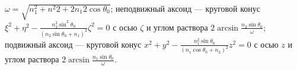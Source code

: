 $\omega=\sqrt{n^2_{1}+n^2{2}+2n_{1}{2}\cos\theta_{0}}$; неподвижный аксоид --- круговой конус
$\xi^2+\eta^2-\frac{n^2_{2}\sin^2\theta_{0}}{\left(n_{2}\sin\theta_{0}+n_{1}\right)^2}\zeta^2=0$ с осью $\zeta$ и углом раствора
$2\arcsin\frac{n_{2}\sin\theta_{0}}{\omega}$; подвижный аксоид --- круговой конус 
$x^2+y^2-\frac{n^2_{1}\sin\theta_{0}}{\left(n_{1}\cos\theta_{0}+n_{2}\right)^2}z^2=0$ с осью $z$ и углом раствора $2\arcsin\frac{n_{1}\sin\theta_{0}}{\omega}$.
